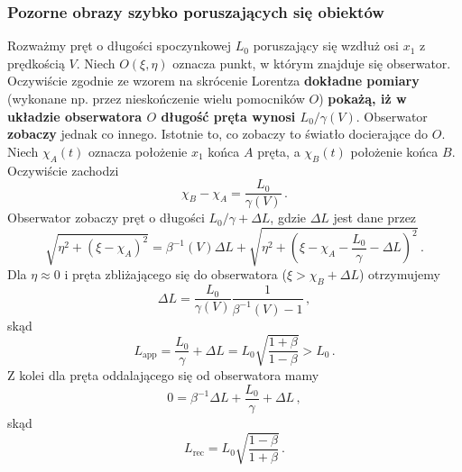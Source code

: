 \documentclass[../main.tex]{subfiles}
\begin{document}
\subsubsection{Pozorne obrazy szybko poruszających się obiektów}
Rozważmy pręt o długości spoczynkowej \(L_0\) poruszający się wzdłuż osi \(x_1\) z prędkością \(V\). Niech \(O(\xi,\eta)\) oznacza punkt, w którym znajduje się obserwator. Oczywiście zgodnie ze wzorem na skrócenie Lorentza \textbf{dokładne pomiary} (wykonane np. przez nieskończenie wielu pomocników \(O\)) \textbf{pokażą, iż w układzie obserwatora \(O\) długość pręta wynosi \(L_0/\gamma(V)\)}. Obserwator \textbf{zobaczy} jednak co innego. Istotnie to, co zobaczy to światło docierające do \(O\). Niech \(\chi_A(t)\) oznacza położenie \(x_1\) końca \(A\) pręta, a \(\chi_B(t)\) położenie końca \(B\). Oczywiście zachodzi
\begin{equation*}
    \chi_B-\chi_A=\frac{L_0}{\gamma(V)}\,.
\end{equation*}
Obserwator zobaczy pręt o długości \(L_0/\gamma+\Delta L\), gdzie \(\Delta L\) jest dane przez
\begin{equation*}
    \sqrt{\eta^2+(\xi-\chi_A)^2}=\beta^{-1}(V)\Delta L+\sqrt{\eta^2+\left(\xi-\chi_A-\frac{L_0}{\gamma}-\Delta L\right)^2}\,.
\end{equation*}
Dla \(\eta\approx 0\) i pręta zbliżającego się do obserwatora (\(\xi>\chi_B+\Delta L\)) otrzymujemy
\begin{equation*}
    \Delta L=\frac{L_0}{\gamma(V)}\frac{1}{\beta^{-1}(V)-1}\,,
\end{equation*}
skąd
\begin{equation*}
    L_\text{app}=\frac{L_0}{\gamma}+\Delta L=L_0\sqrt{\frac{1+\beta}{1-\beta}}>L_0\,.
\end{equation*}
Z kolei dla pręta oddalającego się od obserwatora mamy
\begin{equation*}
    0=\beta^{-1}\Delta L+\frac{L_0}{\gamma}+\Delta L\,,
\end{equation*}
skąd
\begin{equation*}
    L_\text{rec}=L_0\sqrt{\frac{1-\beta}{1+\beta}}\,.
\end{equation*}
\end{document}
